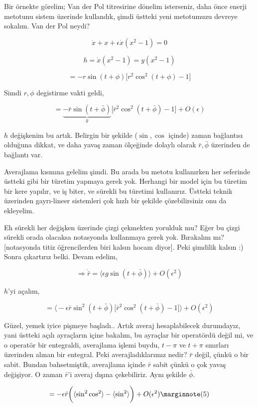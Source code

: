 \documentclass[12pt,fleqn]{article}\usepackage{../../common}
\begin{document}
Bir örnekte görelim; Van der Pol titresirine dönelim isterseniz, daha önce
enerji metotunu sistem üzerinde kullandık, şimdi üstteki yeni metotumuzu devreye
sokalım. Van der Pol neydi?

$$ \ddot{x} + x + \epsilon \dot{x}(x^2-1) = 0 $$

$$ h = \dot{x}(x^2-1)  = y(x^2-1) $$

$$ = -r \sin(t + \phi) \bigg[ r^2 \cos^2(t+\phi) - 1 \bigg]$$

Simdi $r,\phi$ degistirme vakti geldi,

$$
= \underbrace{-\bar{r} \sin(t + \bar{\phi})}_{y}
\bigg[ \bar{r}^2 \cos^2(t+\bar{\phi}) - 1 \bigg] + O(\epsilon)$$

$h$ değişkenim bu artık. Belirgin bir şekilde ($\sin,\cos$ içinde) zaman
bağlantısı olduğuna dikkat, ve daha yavaş zaman ölçeğinde dolaylı olarak
$\bar{r},\bar{\phi}$ üzerinden de bağlantı var.

Averajlama kısmına gelelim şimdi. Bu arada bu metotu kullanırken her seferinde
üstteki gibi bir türetim yapmaya gerek yok. Herhangi bir model için bu türetim
bir kere yapılır, ve iş biter, ve sürekli bu türetimi kullanırız. Üstteki teknik
üzerinden gayrı-lineer sistemleri çok hızlı bir şekilde çözebilirsiniz onu da
ekleyelim.

Eh sürekli her değişken üzerinde çizgi çekmekten yorulduk mu? Eğer bu çizgi
sürekli orada olacaksa notasyonda kullanmaya gerek yok. Bırakalım mı?
[notasyonda titiz öğrencilerden biri kalsın hocam diyor]. Peki şimdilik kalsın
:) Sonra çıkartırız belki. Devam edelim,

$$ \Rightarrow \dot{\bar{r}} =
\bigl\langle \epsilon g \sin (t+\bar{\phi}) \bigr\rangle + O(\epsilon^2)
$$

$h$'yi açalım,

$$
= \biggl\langle -\epsilon \bar{r} \sin^2 (t+\bar{\phi})
\big[ \bar{r}^2 \cos^2 (t+\bar{\phi}) - 1\big]
\biggr\rangle + O(\epsilon^2)
$$

Güzel, yemek iyice pişmeye başladı.. Artık averaj hesaplabilecek durumdayız,
yani üstteki açılı ayraçların içine bakalım, bu ayraçlar bir operatördü değil
mi, ve o operatör bir entegraldi, averajlama işlemi buydu, $t-\pi$ ve $t+\pi$
sınırları üzerinden alınan bir entegral. Peki averajladıklarımız nedir?
$\bar{r}$ değil, çünkü o bir sabit. Bundan bahsetmiştik, averajlama içinde
$\bar{r}$ sabit çünkü o çok yavaş değişiyor. O zaman $\bar{r}$'i averaj dışına
çekebiliriz. Aynı şekilde $\bar{\phi}$.

$$ = -\epsilon \bar{r} \bigg(
\langle \sin^2\cos^2 \rangle - \langle \sin^2 \rangle 
\bigg) + O(\epsilon^2)
\mlabel{5}
$$
\end{document}
